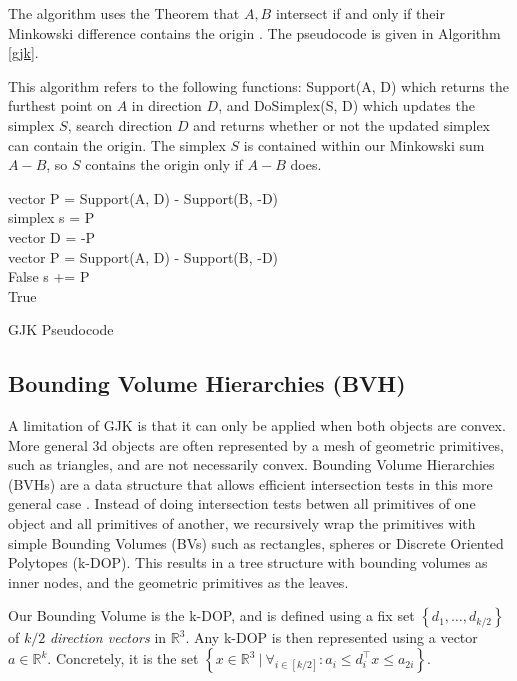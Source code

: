 \documentclass[twocolumn]{article}
\begin{document}
The algorithm uses the Theorem that $A, B$ intersect if and only if their Minkowski difference contains the origin \cite{bams/1183523140}. The pseudocode is given in Algorithm \ref{gjk}. 

This algorithm refers to the following functions: Support(A, D) which returns the furthest point on $A$ in direction $D$, and DoSimplex(S, D) which updates the simplex $S$, search direction $D$ and returns whether or not the updated simplex can contain the origin. The simplex $S$ is contained within our Minkowski sum $A - B$, so $S$ contains the origin only if $A-B$ does. 

\begin{algorithm}
\DontPrintSemicolon
 vector P = Support(A, D) - Support(B, -D) \\
 simplex s = {P} \\
 vector  D = -P \\
 {
 	vector P = Support(A, D) - Support(B, -D) \\
    {
       \Return False    
    }
    s += {P} \\
    {
       \Return True    
    }
 }

\caption{GJK Pseudocode}
\label{gjk}
\end{algorithm}

\subsection{Bounding Volume Hierarchies (BVH)} 
\label{bvhbasics}

A limitation of GJK is that it can only be applied when both objects are convex. More general 3d objects are often represented by a mesh of geometric primitives, such as triangles, and are not necessarily convex. Bounding Volume Hierarchies (BVHs) are a data structure that allows efficient intersection tests in this more general case \cite{simdop}. Instead of doing intersection tests betwen all primitives of one object and all primitives of another, we recursively wrap the primitives with simple Bounding Volumes (BVs) such as rectangles, spheres or Discrete Oriented Polytopes (k-DOP). This results in a tree structure with bounding volumes as inner nodes, and the geometric primitives as the leaves. 

Our Bounding Volume is the k-DOP, and is defined using a fix set $\left\{d_1, \hdots, d_{k/2}\right\}$ of $k/2$ \textit{direction vectors} in $\mathbb{R}^3$. 
Any k-DOP is then represented using a vector $a \in \mathbb{R}^k$.
Concretely, it is the set $\left\{x \in \mathbb{R}^3 \ |\   \forall_{i \in \left[k/2\right]}: a_i \leq d_i^\top x \leq a_{2i} \right\}$.
\end{document}
